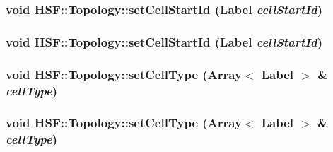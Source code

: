 \label{classHSF_1_1Topology_a531b20b476fb3cfc39526e949f20bb27}
\hypertarget{classHSF_1_1Topology_a531b20b476fb3cfc39526e949f20bb27}{
\subsubsection[{setCellStartId}]{\setlength{\rightskip}{0pt plus 5cm}void HSF::Topology::setCellStartId ({\bf Label} {\em cellStartId})}}
\label{classHSF_1_1Topology_a531b20b476fb3cfc39526e949f20bb27}
\hypertarget{classHSF_1_1Topology_a531b20b476fb3cfc39526e949f20bb27}{
\subsubsection[{setCellStartId}]{\setlength{\rightskip}{0pt plus 5cm}void HSF::Topology::setCellStartId ({\bf Label} {\em cellStartId})}}
\label{classHSF_1_1Topology_a531b20b476fb3cfc39526e949f20bb27}
\hypertarget{classHSF_1_1Topology_a42c3fe3a125b6b4576aeea273a9c849c}{
\subsubsection[{setCellType}]{\setlength{\rightskip}{0pt plus 5cm}void HSF::Topology::setCellType (Array$<$ {\bf Label} $>$ \& {\em cellType})}}
\label{classHSF_1_1Topology_a42c3fe3a125b6b4576aeea273a9c849c}
\hypertarget{classHSF_1_1Topology_a42c3fe3a125b6b4576aeea273a9c849c}{
\subsubsection[{setCellType}]{\setlength{\rightskip}{0pt plus 5cm}void HSF::Topology::setCellType (Array$<$ {\bf Label} $>$ \& {\em cellType})}}
